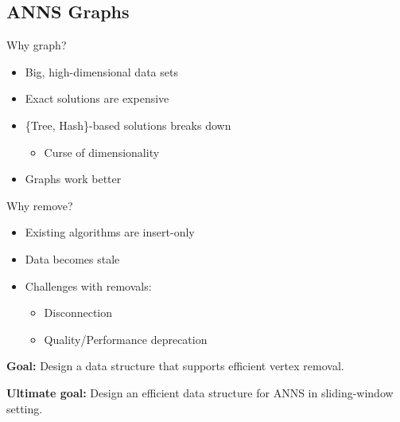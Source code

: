 \subsection{ANNS Graphs}

\begin{frame}{Why graph?}
    \begin{itemize}
        \item Big, high-dimensional data sets
        \item Exact solutions are expensive
        \item \{Tree, Hash\}-based solutions breaks down
            \begin{itemize}
                \item Curse of dimensionality
            \end{itemize}
        \item Graphs work better
    \end{itemize}
\end{frame}

\begin{frame}{Why remove?}
    \begin{itemize}
        \item Existing algorithms are insert-only
        \item Data becomes stale
        \item Challenges with removals:
            \begin{itemize}
                \item Disconnection
                \item Quality/Performance deprecation
            \end{itemize}
    \end{itemize}
\end{frame}

\begin{frame}
    \centering
    \textbf{Goal:} Design a data structure that supports efficient vertex removal.

    \textbf{Ultimate goal:} Design an efficient data structure for ANNS in sliding-window setting.
\end{frame}

